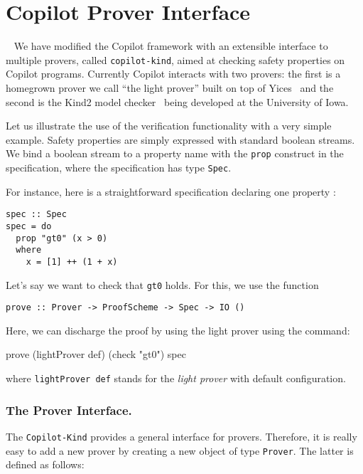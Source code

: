 \section{Copilot Prover Interface}~\label{sec:prover} 
We have modified  the Copilot framework with an extensible interface  to multiple
provers, called \texttt{copilot-kind}, aimed at checking  safety properties on Copilot
programs. Currently Copilot interacts with two provers: the first is a
homegrown prover we call ``the light prover'' built on top of
Yices~\cite{Dutertre:cav2014} and the second is the Kind2 model checker~\cite{kind2} being developed at
the University of Iowa.

Let us illustrate the use of the verification functionality with a
very simple example.  Safety properties are simply expressed with
standard boolean streams.  We bind a boolean stream to a property name
with the \texttt{prop} construct in the specification, where the
specification has type \texttt{Spec}.

For instance, here is a straightforward specification declaring one
property :

\begin{lstlisting}[frame=single]
spec :: Spec
spec = do
  prop "gt0" (x > 0)
  where
    x = [1] ++ (1 + x)
\end{lstlisting}

Let's say we want to check that \texttt{gt0} holds. For this, we use
the function

\begin{lstlisting}[frame=single]
    prove :: Prover -> ProofScheme -> Spec -> IO ()
\end{lstlisting}

Here, we can discharge the proof by  using the light prover using the command:
\begin{code}
prove (lightProver def) (check "gt0") spec
\end{code}
where \texttt{lightProver def} stands for the \emph{light prover} with
default configuration.  

\subsubsection{The Prover Interface.}\label{the-prover-interface}

The \texttt{Copilot-Kind} provides a general interface for
provers. Therefore, it is really easy to add a new prover by creating a
new object of type \texttt{Prover}. The latter is defined as follows:

